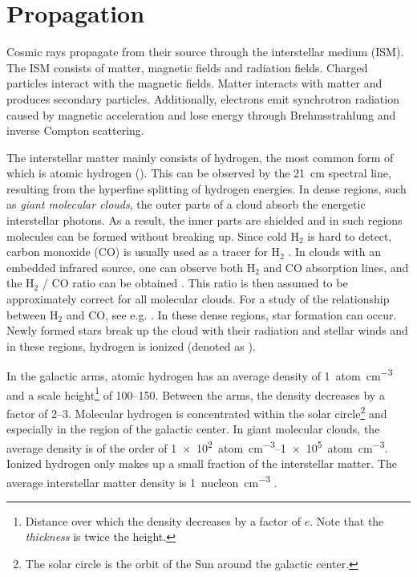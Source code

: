 \section{Propagation}

Cosmic rays propagate from their source through the interstellar medium (ISM).
The ISM consists of matter, magnetic fields and radiation fields.  Charged
particles interact with the magnetic fields. Matter interacts with matter and
produces secondary particles. Additionally, electrons emit synchrotron
radiation caused by magnetic acceleration and lose energy through
Brehmsstrahlung and inverse Compton scattering.

The interstellar matter mainly consists of hydrogen, the most common form of which is
atomic hydrogen (\hi).  This can be observed by the \SI{21}{\centi\meter}
spectral line, resulting from the hyperfine splitting of hydrogen energies.
In dense regions, such as \emph{giant molecular clouds}, the outer parts of a cloud
absorb the energetic interstellar photons.  As a result, the inner parts are
shielded and in such regions molecules can be formed without breaking up.
Since cold H$_2$ is hard to detect, carbon monoxide (CO) is usually used as a
tracer for H$_2$ \cite{Combes:1997}. In clouds with an embedded infrared source,
one can observe both H$_2$ and CO absorption lines, and the H$_2$ / CO ratio can
be obtained \parencite{Lacy:1994}. This ratio is then assumed to be
approximately correct for all molecular clouds.  For a study of the relationship
between H$_2$ and CO, see e.g. \textcite{Glover:2011}.
In these dense regions, star formation can occur. Newly formed stars break up
the cloud with their radiation and stellar winds and in these regions, hydrogen is
ionized (denoted as \hii).

In the galactic arms, atomic hydrogen has an average density of
\SI{1}{atom\per\centi\meter\cubed} and a scale height\footnote{Distance over
which the density decreases by a factor of $e$.  Note that the \emph{thickness}
is twice the height.} of \SIrange{100}{150}{\parsec}.  Between the arms, the
density decreases by a factor of \numrange{2}{3}.  Molecular hydrogen is
concentrated within the solar circle\footnote{The solar circle is the orbit of
the Sun around the galactic center.} and especially in the region of the galactic
center.  In giant molecular clouds, the average density is of the order of
\SIrange[allow-number-unit-breaks]{1e2}{1e5}{atom\per\centi\meter\cubed}.
Ionized hydrogen only makes up a small fraction of the interstellar matter. The
average interstellar matter density is \SI{1}{nucleon\per\centi\meter\cubed}
\cite[75]{Stanev:2004}.

